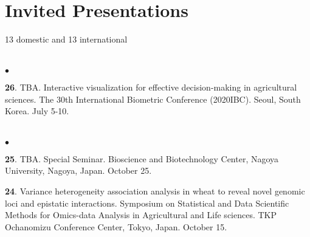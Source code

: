 \documentclass[margin,line,10pt]{res}
\newenvironment{list2}{
  \begin{list}{$\bullet$}{%
      \setlength{\itemsep}{0in}
      \setlength{\parsep}{0in} \setlength{\parskip}{0in}
      \setlength{\topsep}{0in} \setlength{\partopsep}{0in} 
      \setlength{\leftmargin}{0.2in}}}{\end{list}}
\begin{document}
\begin{resume}


\vspace{0.5cm}
\section{\sc Invited Presentations}
\vspace{0.5cm}
13 domestic and 13 international \\
\noindent

\section{}
\begin{list2}

\item [{\bf 26}.] TBA. Interactive visualization for effective decision-making in agricultural sciences. The 30th International Biometric Conference (2020IBC). Seoul, South Korea. July 5-10.


\end{list2}



\section{}
\begin{list2}

\item [{\bf 25}.] TBA. Special Seminar. Bioscience and Biotechnology Center, Nagoya University, Nagoya, Japan. October 25. 
  
  \vspace{0.5cm}
  
   \item [{\bf 24}.] Variance heterogeneity association analysis in wheat to reveal novel genomic loci and epistatic interactions. Symposium on Statistical and Data Scientific Methods for Omics-data Analysis in Agricultural and Life sciences. TKP Ochanomizu Conference Center, Tokyo, Japan. October 15.

     \vspace{0.5cm}
    

\end{list2}
\end{resume}
\end{document}
